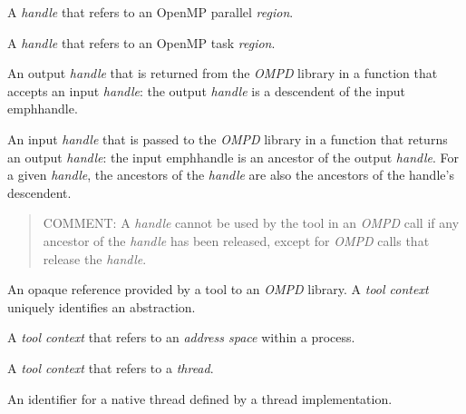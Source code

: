 \glossarydefstart
A \emph{handle} that refers to an OpenMP parallel \emph{region}.
\glossarydefend

\glossarydefstart
A \emph{handle} that refers to an OpenMP task \emph{region}.
\glossarydefend

\glossarydefstart
An output \emph{handle} that is returned from the \emph{OMPD} library 
in a function that accepts an input \emph{handle}: the output \emph{handle} 
is a descendent of the input emph{handle}.
\glossarydefend

\glossarydefstart
An input \emph{handle} that is passed to the \emph{OMPD} library in a 
function that returns an output \emph{handle}: the input emph{handle} 
is an ancestor of the output \emph{handle}. For a given \emph{handle}, 
the ancestors of the \emph{handle} are also the ancestors of the handle's 
descendent.

\begin{quote}
	COMMENT: A \emph{handle} cannot be used by the tool in an \emph{OMPD}
        call if any ancestor of the \emph{handle} has been released, except 
        for \emph{OMPD} calls 	that release the \emph{handle}.
\end{quote}
\glossarydefend

\glossarydefstart
An opaque reference provided by a tool to an \emph{OMPD} library. 
A \emph{tool context} uniquely identifies an abstraction.
\glossarydefend

\glossarydefstart
A \emph{tool context} that refers to an \emph{address space} within a process.
\glossarydefend

\glossarydefstart
A \emph{tool context} that refers to a \emph{thread}.
\glossarydefend

\glossarydefstart
An identifier for a native thread defined by a thread implementation.
\glossarydefend


